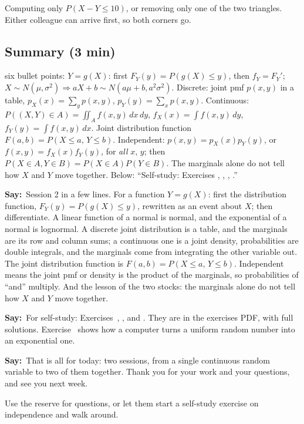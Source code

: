\documentclass[11pt,a4paper,parskip=half]{scrartcl}
\renewcommand{\needspace}[1]{\Needspace{6\baselineskip}}
\newcommand{\say}{\textbf{\color{teal}Say:}\ }
\begin{document}
\begin{mistake}
	Computing only $P(X-Y\le10)$, or removing only one of the two triangles.
	Either colleague can arrive first, so both corners go.
\end{mistake}

\needspace{0.25\textheight}

\begin{printskip}
	\subsection{Summary (3 min)}

	\begin{onslide}
		six bullet points: $Y=g(X)$: first $F_Y(y)=P(g(X)\le y)$, then
		$f_Y=F_Y'$; $X\sim N(\mu,\sigma^2)\Rightarrow aX+b\sim
		N(a\mu+b,a^2\sigma^2)$. Discrete: joint pmf $p(x,y)$ in a table,
		$p_X(x)=\sum_y p(x,y)$, $p_Y(y)=\sum_x p(x,y)$. Continuous:
		$P((X,Y)\in A)=\iint_A f(x,y)\,dx\,dy$, $f_X(x)=\int f(x,y)\,dy$,
		$f_Y(y)=\int f(x,y)\,dx$. Joint distribution function
		$F(a,b)=P(X\le a,\,Y\le b)$. Independent: $p(x,y)=p_X(x)p_Y(y)$, or
		$f(x,y)=f_X(x)f_Y(y)$, for \emph{all} $x$, $y$; then
		$P(X\in A,Y\in B)=P(X\in A)P(Y\in B)$. The marginals alone do not tell
		how $X$ and $Y$ move together. Below: ``Self-study: Exercises
		, , ,
		.''
	\end{onslide}

	\say Session 2 in a few lines. For a function $Y=g(X)$: first the
	distribution function, $F_Y(y)=P(g(X)\le y)$, rewritten as an event
	about $X$; then differentiate. A linear function of a normal is normal,
	and the exponential of a normal is lognormal. A discrete joint
	distribution is a table, and the marginals are its row and column sums;
	a continuous one is a joint density, probabilities are double
	integrals, and the marginals come from integrating the other variable
	out. The joint distribution function is $F(a,b)=P(X\le a,\,Y\le b)$.
	Independent means the joint pmf or density is the product of the
	marginals, so probabilities of ``and'' multiply. And the lesson of the
	two stocks: the marginals alone do not tell how $X$ and $Y$ move
	together.

	\say For self-study: Exercises~,
	,  and
	. They are in the exercises PDF, with full
	solutions. Exercise~ shows how a computer turns a
	uniform random number into an exponential one.

	\say That is all for today: two sessions, from a single continuous random
	variable to two of them together. Thank you for your work and your
	questions, and see you next week.

	\begin{cue}
		Use the reserve for questions, or let them start a self-study exercise
		on independence and walk around.
	\end{cue}
\end{printskip}
\end{document}
